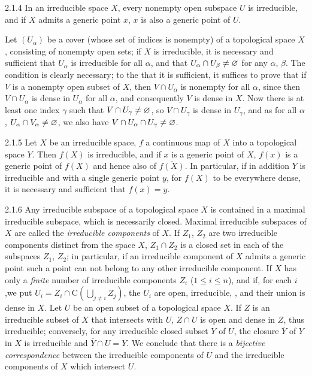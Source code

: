 \begin{env}{2.1.4}
In an irreducible space $X$, every nonempty open subspace $U$ is irreducible, and if $X$
admits a generic point $x$, $x$ is also a generic point of $U$.

Let $(U_\alpha)$ be a cover (whose set of indices is nonempty) of a topological space $X$,
consisting of nonempty open sets; if $X$ is irreducible, it is necessary and sufficient that
$U_\alpha$ is irreducible for all $\alpha$, and that $U_\alpha\cap U_\beta\neq\varnothing$ for any
$\alpha$, $\beta$. The condition is clearly necessary; to the that it is sufficient, it suffices
to prove that if $V$ is a nonempty open subset of $X$, then $V\cap U_\alpha$ is nonempty for all
$\alpha$, since then $V\cap U_\alpha$ is dense in $U_\alpha$ for all $\alpha$, and consequently
$V$ is dense in $X$. Now there is at least one index $\gamma$ such that $V\cap U_\gamma\neq\varnothing$,
so $V\cap U_\gamma$ is dense in $U_\gamma$, and as for all $\alpha$, $U_\alpha\cap V_\alpha\neq\varnothing$,
we also have $V\cap U_\alpha\cap U_\gamma\neq\varnothing$.
\end{env}

\begin{env}{2.1.5}
Let $X$ be an irreducible space, $f$ a continuous map of $X$ into a topological space $Y$.
Then $f(X)$ is irreducible, and if $x$ is a generic point of $X$, $f(x)$ is a generic point of
$f(X)$ and hence also of $\overline{f(X)}$. In particular, if in addition $Y$ is irreducible and
with a single generic point $y$, for $f(X)$ to be everywhere dense, it is necessary and sufficient
that $f(x)=y$.
\end{env}

\begin{env}{2.1.6}
Any irreducible subspace of a topological space $X$ is contained
in a maximal irreducible subspace, which is necessarily closed.
Maximal irreducible subspaces of $X$ are called the \emph{irreducible components} of $X$.
If $Z_1$, $Z_2$ are two irreducible components distinct from the space $X$, $Z_1\cap Z_2$ is a closed
 set in each of the subspaces $Z_1$, $Z_2$; in particular, if an irreducible component
of $X$ admits a generic point  such a point can not belong to any other
irreducible component. If $X$ has only a \emph{finite} number of irreducible 
components $Z_i$ ($1\leq i\leq n$), and if, for each $i$,we put $U_i=Z_i\cap\mathrm{C}(\bigcup_{j\neq i}Z_j)$,
the $U_i$ are open, irreducible, , and their union is dense in $X$.
Let $U$ be an open subset of a topological space $X$. If $Z$ is an irreducible subset of $X$
that intersects with $U$, $Z\cap U$ is open and dense in $Z$, thus irreducible; conversely, for any irreducible
closed subset $Y$ of $U$, the closure $\overline{Y}$ of $Y$ in $X$ is irreducible and $\overline{Y}\cap U=Y$.
We conclude that there is a \emph{bijective correspondence} between the irreducible components of $U$ and the
irreducible components of $X$ which intersect $U$.
\end{env}

